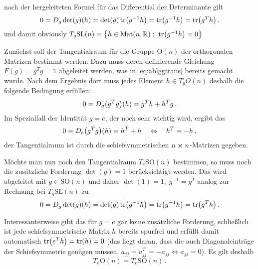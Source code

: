 \documentclass[../H_Analysis_main.tex]{subfiles}
\begin{document}
\begin{bsp}
nach der hergeleiteten Formel für das Differential der Determinante gilt
\begin{equation}
0 = D_g \det(g) (h) = \det(g) \tr(g^{-1} h) = \tr(g^{-1} h) = \tr(g^T h) \, .
\end{equation}
und damit obviously $T_g \text{SL}(n) = \qty{h \in \text{Mat}(n, \mathbb{R}): \; \tr(g^{-1} h) = 0}$%
\end{bsp}

\begin{bsp}[Tangentialraum zu O$(n)$%
]\label{bsp:tangraumso}
Zunächst soll der Tangentialraum für die Gruppe O$(n)$ der orthogonalen Matrizen bestimmt werden. Dazu muss deren definierende Gleichung $F(g) = g^T g = \mathds{1}$ abgeleitet werden, was in \eqref{eq:ablggtrans} bereits gemacht wurde. Nach dem Ergebnis dort muss jedes Element $h \in T_g O(n)$ deshalb die folgende Bedingung erfüllen:
\begin{align}
0 = D_g \qty(g^T g)(h) = g^T h + h^T g \, .
\end{align}
Im Spezialfall der Identität $g = e$, der noch sehr wichtig wird, ergibt das
\begin{align}
0 = D_e \qty(g^T g)(h) = h^T + h \quad \Leftrightarrow \quad h^T = - h \, ,
\end{align}
der Tangentialraum ist durch die schiefsymmetrischen $n \cross n$-Matrizen gegeben.


Möchte man nun noch den Tangentialraum $T_e \text{SO}(n)$ bestimmen, so muss noch die zusätzliche Forderung $\det(g) = 1$ berücksichtigt werden. Das wird abgeleitet mit $g \in \text{SO}(n)$ und daher $\det(1) = 1, \; g^{-1} = g^T$ analog zur Rechnung bei $T_g \text{SL}(n)$ zu
\begin{equation*}
0 = D_g \det(g) (h) = \det(g) \tr(g^{-1} h) = \tr(g^{-1} h) = \tr(g^T h) \, .
\end{equation*}

Interessanterweise gibt das für $g = e$ gar keine zusätzliche Forderung, schließlich ist jede schiefsymmetrische Matrix $h$ bereits spurfrei und erfüllt damit automatisch $\tr(e^T h) = \tr(h) = 0$ (das liegt daran, dass die auch Diagonaleinträge der Schiefsymmetrie genügen müssen, $a_{jj} = a^T_{jj} = - a_{jj} \Leftrightarrow a_{jj} = 0$). Es gilt deshalb
\begin{equation}
T_e \text{O}(n) = T_e \text{SO}(n) \, .
\end{equation}
\end{bsp}
\end{document}

